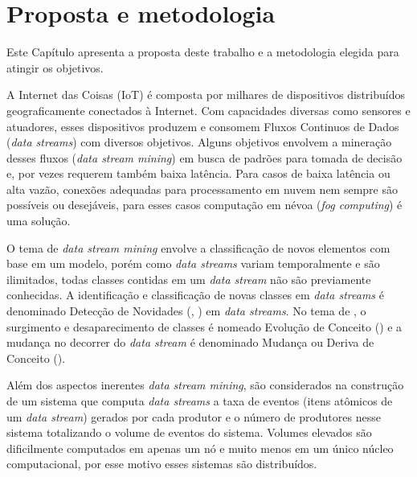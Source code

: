 \chapter{Proposta e metodologia}\label{cha:proposta}

\begin{resumocap}

  Este Capítulo apresenta a proposta deste trabalho e a metodologia elegida para
  atingir os objetivos.

\end{resumocap}

\newcommand{\fog}{\emph{fog computing}\xspace}
\newcommand{\cloud}{\emph{cloud computing}\xspace}

\newcommand{\iot}{IoT\xspace}

\newcommand{\stream}{\emph{data stream}\xspace}
\newcommand{\streams}{\emph{data streams}\xspace}
\newcommand{\streamMining}{\emph{data stream mining}\xspace}

\newcommand{\mfog}{M-FOG\xspace}
\newcommand{\flink}{\emph{Apache Flink}\xspace}

A Internet das Coisas (\iot) é composta por milhares de dispositivos distribuídos
geograficamente conectados à Internet.
Com capacidades diversas como sensores e atuadores, esses dispositivos produzem e
consomem Fluxos Continuos de Dados (\streams) com diversos objetivos.
Alguns objetivos envolvem a mineração desses fluxos (\streamMining) em busca de
padrões para tomada de decisão e, por vezes requerem também baixa latência.
Para casos de baixa latência ou alta vazão, conexões adequadas para
processamento em nuvem nem sempre são possíveis ou desejáveis, para esses casos
computação em névoa (\fog) é uma solução.

O tema de \streamMining envolve a classificação de novos elementos com base em
um modelo, porém como \streams variam temporalmente e são ilimitados, todas
classes contidas em um \stream não são previamente conhecidas.
A identificação e classificação de novas classes em \streams é denominado
Detecção de Novidades (\novelty, \nd) em \streams.
No tema de \nd, o surgimento e desaparecimento de classes é nomeado Evolução de Conceito
(\evolution) e a mudança no decorrer do \stream é denominado Mudança ou Deriva
de Conceito (\drift).

Além dos aspectos inerentes \streamMining, são considerados na construção de um
sistema que computa \streams a taxa de eventos (itens atômicos de um \stream)
gerados por cada produtor e o número de produtores nesse sistema totalizando o
volume de eventos do sistema.
Volumes elevados são dificilmente computados em apenas um nó e muito menos em um
único núcleo computacional, por esse motivo esses sistemas são distribuídos.

